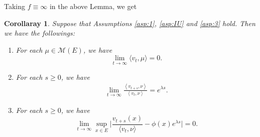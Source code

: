 \documentclass[12pt,a4paper]{amsart}
\numberwithin{equation}{section}
\theoremstyle{plain}
\newtheorem{cor}[thm]{Corollaray}
\theoremstyle{definition}
\begin{document}
Taking $f \equiv \infty$ in the above Lemma, we get
\begin{cor}
\label{cor:extinct}
    Suppose that Assumptions \ref{asp:1}, \ref{asp:IU} and \ref{asp:3} hold.
    Then we have the followings:
\begin{enumerate}
\item 
\label{sub:extinct_2}
    For each $\mu \in \mathcal M(E)$, we have
    \[
      \lim_{t\rightarrow\infty}\langle v_t,\mu\rangle=0.
    \]
\item 
\label{sub:extinct_2_1}
    For each $s\geq 0$, we have
     \begin{align}
       \lim_{t\to \infty} \frac{\left\langle v_{t+s},\nu\right\rangle}{\left\langle v_t,\nu\right\rangle} 
= e^{\lambda s}.
     \end{align}
\item 
\label{sub:extinct_3}
    For each $s\geq 0$, we have
\begin{equation} 
    \lim_{t\to \infty} \sup_{x\in E}\Big|\frac{v_{t+s}(x)}{\langle v_t,\nu\rangle } - \phi(x)e^{\lambda s} \Big|
    =0.
\end{equation}
\end{enumerate}
\end{cor}
\end{document}
